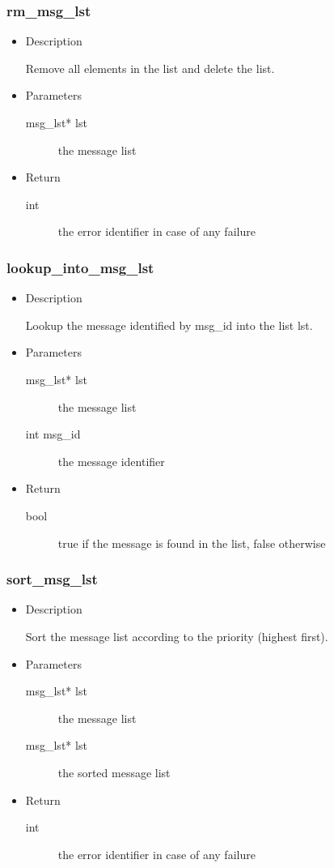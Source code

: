 \subsubsection{rm\_msg\_lst}
\begin{itemize}
\item{Description}

	Remove all elements in the list and delete the list.
\item{Parameters}
	\begin{description}
	\item[msg\_lst* lst] the message list
	\end{description}
\item{Return}
	\begin{description}
	\item[int] the error identifier in case of any failure
	\end{description}
\end{itemize}

\subsubsection{lookup\_into\_msg\_lst}
\begin{itemize}
\item{Description}

	Lookup the message identified by msg\_id into the list lst.
\item{Parameters}
	\begin{description}
	\item[msg\_lst* lst] the message list
	\item[int msg\_id] the message identifier
	\end{description}
\item{Return}
	\begin{description}
	\item[bool] true if the message is found in the list, false otherwise
	\end{description}
\end{itemize}

\subsubsection{sort\_msg\_lst}
\begin{itemize}
\item{Description}

	Sort the message list according to the priority (highest first).
\item{Parameters}
	\begin{description}
	\item[msg\_lst* lst] the message list
	\item[msg\_lst* lst] the sorted message list
	\end{description}
\item{Return}
	\begin{description}
	\item[int] the error identifier in case of any failure
	\end{description}
\end{itemize}

